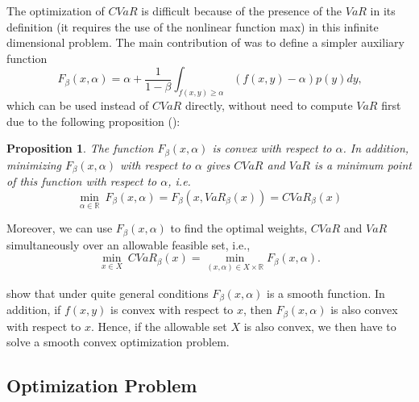 \documentclass[a4paper,10pt]{article}
\newtheorem{proposition}{Proposition}
\begin{document}
The optimization of $CVaR$ is difficult because of the presence of the $VaR$
in its definition (it requires the use of the nonlinear function max) in
this infinite dimensional problem. The main contribution of \citet*{%
	rockafellar2000} was to define a simpler auxiliary function
\begin{equation}
F_{\beta }\left( x,\alpha \right) = \alpha +\frac{1}{1-\beta }%
\int_{f(x,y)\geq \alpha }\left( f(x,y)-\alpha \right) p(y)dy\text{,}
\label{six}
\end{equation}%
which can be used instead of $CVaR$ directly, without need to compute $VaR$
first due to the following proposition (\citet*{pflug2000}): \bigskip

\begin{proposition}
	The function $F_{\beta }\left( x,\alpha \right) $ is convex with respect to $%
	\alpha $. In addition, minimizing $F_{\beta }\left( x,\alpha \right) $ with
	respect to $\alpha $ gives $CVaR$ and $VaR$ is a minimum point of this
	function with respect to $\alpha $, i.e.
	\begin{equation}
	\underset{\alpha \in
		\mathbb{R}
	}{\min }~F_{\beta }\left( x,\alpha \right) =F_{\beta }\left( x,VaR_{\beta
	}\left( x\right) \right) =CVaR_{\beta }(x)  \label{seven}
	\end{equation}
\end{proposition}

Moreover, we can use $F_{\beta }\left( x,\alpha \right) $ to find the optimal weights, $CVaR$ and
$VaR$ simultaneously over an allowable feasible set, i.e.,
\begin{equation}
\underset{x\in X}{\min }~CVaR_{\beta }(x)=\underset{}{\underset{\left(
		x,\alpha \right) \in X\times
		\mathbb{R}
	}{\min }F_{\beta }\left( x,\alpha \right) }.  \label{eight}
\end{equation}

\citet*{pflug2000} show that under quite general conditions $F_{\beta
}\left( x,\alpha \right) $ is a smooth function. In addition, if $f(x,y)$ is
convex with respect to $x$, then $F_{\beta }\left( x,\alpha \right) $ is
also convex with respect to $x$. Hence, if the allowable set $X$ is also
convex, we then have to solve a smooth convex optimization problem.

\subsection{Optimization Problem}
\end{document}
